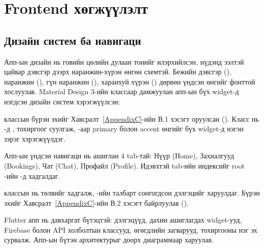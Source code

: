 
\section{Frontend хөгжүүлэлт}

\subsection*{Дизайн систем ба навигаци}

Апп-ын дизайн нь говийн цөлийн дулаан тонийг илэрхийлсэн, нүдэнд ээлтэй цайвар дэвсгэр дээрх наранжин-хүрэн өнгөн схемтэй. Бежийн дэвсгэр (), наранжин (), гүн наранжин (), харанхуй хүрэн () дөрвөн үндсэн өнгийг  фонттой хослуулав. Material Design 3-ийн  классаар дамжуулан апп-ын бүх widget-д нэгдсэн дизайн систем хэрэгжүүлсэн:

 классын бүрэн эхийг Хавсралт~\ref{AppendixC}-ийн В.1 хэсэгт оруулсан (). Класс нь -д ,  тохиргоог суулгаж, -аар primary болон accent өнгийг бүх widget-д нэгэн зэрэг хэрэгжүүлдэг.

Апп-ын үндсэн навигаци нь  ашиглан 4 tab-тай: Нүүр (Home), Захиалгууд (Bookings), Чат (Chat), Профайл (Profile). Идэвхтэй tab-ийн индексийг root -ийн -д хадгалдаг.

 классын  нь  төлвийг хадгалж, -ийн  талбарт сонгогдсон дэлгэцийг харуулдаг. Бүрэн эхийг Хавсралт~\ref{AppendixC}-ийн В.2 хэсэгт байрлуулав ().

Flutter апп нь давхаргат бүтэцтэй:  дэлгэцүүд,  дахин ашиглагдах widget-ууд,  Firebase болон API холболтын классууд,  өгөгдлийн загварууд,  тохиргооны нэг эх сурвалж. Апп-ын бүтэн архитектурыг доорх диаграммаар харуулав.

